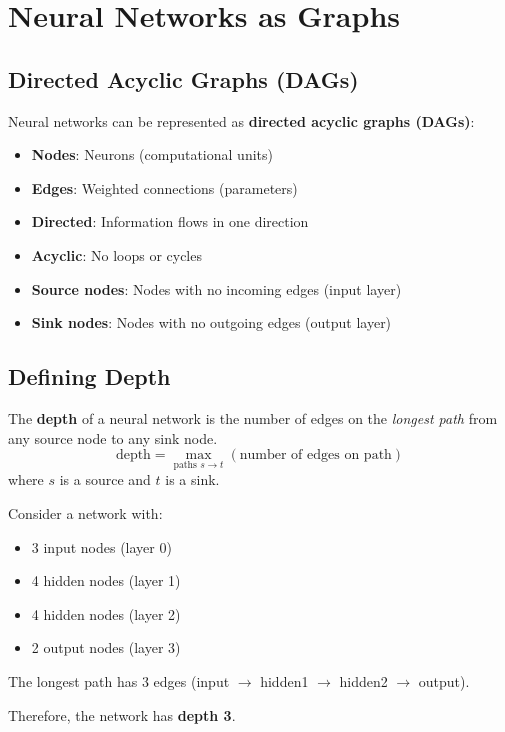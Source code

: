 
\section{Neural Networks as Graphs}

\subsection{Directed Acyclic Graphs (DAGs)}

Neural networks can be represented as \textbf{directed acyclic graphs (DAGs)}:

\begin{itemize}
    \item \textbf{Nodes}: Neurons (computational units)
    \item \textbf{Edges}: Weighted connections (parameters)
    \item \textbf{Directed}: Information flows in one direction
    \item \textbf{Acyclic}: No loops or cycles
\end{itemize}

\begin{definitionbox}
\begin{itemize}
    \item \textbf{Source nodes}: Nodes with no incoming edges (input layer)
    \item \textbf{Sink nodes}: Nodes with no outgoing edges (output layer)
\end{itemize}
\end{definitionbox}

\subsection{Defining Depth}

\begin{definitionbox}
The \textbf{depth} of a neural network is the number of edges on the \textit{longest path} from any source node to any sink node.
\[
\text{depth} = \max_{\text{paths } s \to t} (\text{number of edges on path})
\]
where $s$ is a source and $t$ is a sink.
\end{definitionbox}

\begin{examplebox}
Consider a network with:
\begin{itemize}
    \item 3 input nodes (layer 0)
    \item 4 hidden nodes (layer 1)
    \item 4 hidden nodes (layer 2)
    \item 2 output nodes (layer 3)
\end{itemize}

The longest path has $3$ edges (input $\to$ hidden1 $\to$ hidden2 $\to$ output).

Therefore, the network has \textbf{depth 3}.
\end{examplebox}

